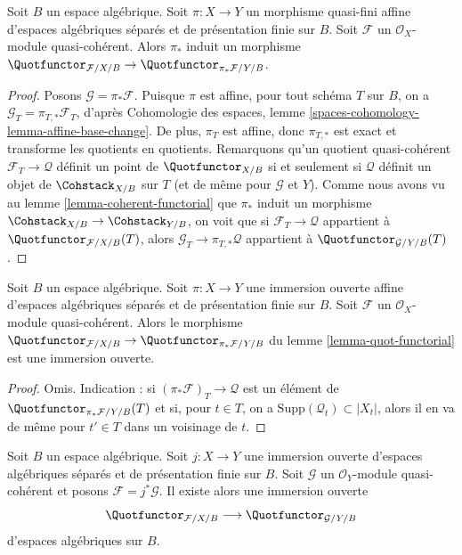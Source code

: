\begin{lemma}
\label{lemma-quot-functorial}
Soit $B$ un espace algébrique. Soit $\pi : X \to Y$ un morphisme
quasi-fini affine d'espaces algébriques séparés et de présentation finie sur
$B$. Soit $\mathcal{F}$ un $\mathcal{O}_X$-module quasi-cohérent.
Alors $\pi_*$ induit un morphisme
$\Quotfunctor_{\mathcal{F}/X/B} \to
\Quotfunctor_{\pi_*\mathcal{F}/Y/B}$.
\end{lemma}

\begin{proof}
Posons $\mathcal{G} = \pi_*\mathcal{F}$. Puisque $\pi$ est affine, pour
tout schéma $T$ sur $B$, on a
$\mathcal{G}_T = \pi_{T, *}\mathcal{F}_T$, d'après Cohomologie des
espaces, lemme \ref{spaces-cohomology-lemma-affine-base-change}.
De plus, $\pi_T$ est affine, donc $\pi_{T, *}$ est exact et transforme les
quotients en quotients. Remarquons qu'un quotient quasi-cohérent
$\mathcal{F}_T \to \mathcal{Q}$ définit un point de
$\Quotfunctor_{X/B}$ si et seulement si $\mathcal{Q}$ définit un objet de
$\Cohstack_{X/B}$ sur $T$ (et de même pour $\mathcal{G}$ et $Y$).
Comme nous avons vu au lemme \ref{lemma-coherent-functorial} que $\pi_*$
induit un morphisme $\Cohstack_{X/B} \to \Cohstack_{Y/B}$, on voit que si
$\mathcal{F}_T \to \mathcal{Q}$ appartient à
$\Quotfunctor_{\mathcal{F}/X/B}(T)$, alors
$\mathcal{G}_T \to \pi_{T, *}\mathcal{Q}$ appartient à
$\Quotfunctor_{\mathcal{G}/Y/B}(T)$.
\end{proof}

\begin{lemma}
\label{lemma-quot-open}
Soit $B$ un espace algébrique. Soit $\pi : X \to Y$ une immersion ouverte
affine d'espaces algébriques séparés et de présentation finie sur $B$.
Soit $\mathcal{F}$ un $\mathcal{O}_X$-module quasi-cohérent. Alors le
morphisme
$\Quotfunctor_{\mathcal{F}/X/B} \to
\Quotfunctor_{\pi_*\mathcal{F}/Y/B}$ du lemme
\ref{lemma-quot-functorial} est une immersion ouverte.
\end{lemma}

\begin{proof}
Omis. Indication : si $(\pi_*\mathcal{F})_T \to \mathcal{Q}$ est un
élément de $\Quotfunctor_{\pi_*\mathcal{F}/Y/B}(T)$ et si, pour
$t \in T$, on a $\text{Supp}(\mathcal{Q}_t) \subset |X_t|$, alors il en
va de même pour $t' \in T$ dans un voisinage de $t$.
\end{proof}

\begin{lemma}
\label{lemma-quot-better-open}
Soit $B$ un espace algébrique. Soit $j : X \to Y$ une immersion ouverte
d'espaces algébriques séparés et de présentation finie sur $B$.
Soit $\mathcal{G}$ un $\mathcal{O}_Y$-module quasi-cohérent et posons
$\mathcal{F} = j^*\mathcal{G}$. Il existe alors une immersion ouverte
$$
\Quotfunctor_{\mathcal{F}/X/B}
\longrightarrow
\Quotfunctor_{\mathcal{G}/Y/B}
$$
d'espaces algébriques sur $B$.
\end{lemma}

